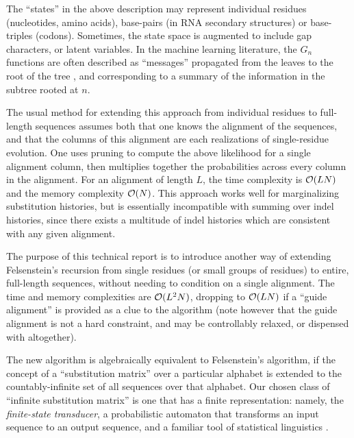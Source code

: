 \documentclass{article}
\begin{document}
The ``states'' in the above description may represent individual residues (nucleotides, amino acids), base-pairs (in RNA secondary structures) or base-triples (codons).
Sometimes, the state space is augmented to include gap characters, or latent variables.
In the machine learning literature, the $G_n$ functions are often described as ``messages'' propagated from the leaves to the root of the tree \cite{KschischangEtAl98},
and corresponding to a summary of the information in the subtree rooted at $n$.

The usual method for extending this approach from individual residues to full-length sequences assumes both that one knows the alignment of the sequences, 
and that the columns of this alignment are each realizations of single-residue evolution.  
One uses pruning to compute the above likelihood for a single alignment column,
then multiplies together the probabilities across every column in the alignment.
For an alignment of length $L$, the time complexity is ${\cal O}(LN)$ and the memory complexity ${\cal O}(N)$.
This approach works well for marginalizing substitution histories, but is essentially incompatible with summing over indel histories,
since there exists a multitude of indel histories which are consistent with any given alignment.

The purpose of this technical report is to introduce another way of extending Felsenstein's recursion from single residues (or small groups of residues)
to entire, full-length sequences, without needing to condition on a single alignment.
The time and memory complexities are ${\cal O}(L^2N)$, dropping to ${\cal O}(LN)$ if a ``guide alignment'' is provided as a clue to the algorithm
(note however that the guide alignment is not a hard constraint, and may be controllably relaxed, or dispensed with altogether).

The new algorithm is algebraically equivalent to Felsenstein's algorithm,
if the concept of a ``substitution matrix'' over a particular alphabet is extended to the countably-infinite set of all sequences over that alphabet.
Our chosen class of ``infinite substitution matrix'' is one that has a finite representation:
namely, the {\em finite-state transducer}, a probabilistic automaton that transforms an input sequence to an output sequence,
and a familiar tool of statistical linguistics \cite{MohriPereiraRiley2000}.
\end{document}
